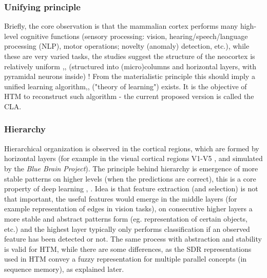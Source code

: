 \documentclass[a4,IEEEconf]{article}
\begin{document}
\subsubsection{Unifying principle}
Briefly, the core observation is that the mammalian \cite{Karten97} cortex \cite{Marr70}\cite{Elston03} performs many high-level cognitive functions \cite{hawkins04}\cite{Hawkins:2010}\cite{journals/corr/Ferrier14}\cite{journals/corr/Byrne15a}\cite{journals/ijon/Lo12} (sensory processing: vision\cite{tso:connectivity}, hearing/speech/language processing (NLP)\cite{Zatorre2002}, motor\cite{RizzolattiFogassiGallese02} operations; novelty (anomaly) detection, etc.), while these are very varied tasks, the studies suggest the structure \cite{DouglasMartin04} of the neocortex \cite{Bienenstock95} is relatively uniform \cite{chaterv03},\cite{1511.00411v1},\cite{krubitzer:tins95} (structured into (micro)columns \cite{pmid9153131} and horizontal layers, with pyramidal neurons \cite{pmid19661433}  inside) \cite{Jones00}\cite{vondermalsburg:principles}! From the materialistic principle this should imply a unified learning algorithm\cite{OReillyRudy00},\cite{Hawkins:2010},\cite{Creutzfeldt77} ("theory of learning") exists. It is the objective of HTM to reconstruct such algorithm - the current proposed version is called the CLA. 


\subsubsection{Hierarchy}
Hierarchical organization is observed in the cortical regions, which are formed by horizontal layers \cite{pmid22147913} (for example in the visual cortical regions V1-V5 \cite{journals/pami/KrugerJKLLPRW13}, and simulated by the \textit{Blue Brain Project}\cite{pmid26451478}). The principle behind hierarchy is emergence of more stable patterns on higher levels (when the predictions are correct), this is a core property of deep learning \cite{Bengio09ftml}, \cite{journals/pami/SalakhutdinovTT13}. Idea is that feature extraction (and selection) is not that important, the useful features would emerge in the middle layers (for example representation of edges in vision tasks), on consecutive higher layers a more stable and abstract patterns form (eg. representation of certain objects, etc.) and the highest layer typically only performs classification if an observed feature has been detected or not. The same process with abstraction and stability is valid for HTM, while there are some differences, as the SDR representations used in HTM convey a fuzzy representation for multiple parallel concepts (in sequence memory), as explained later. 
\end{document}
